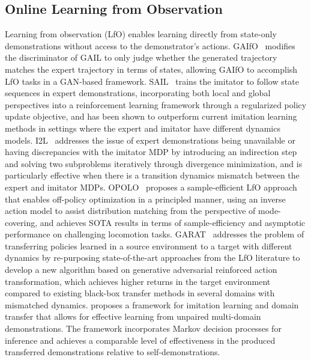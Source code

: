 \subsection{Online Learning from Observation}  
Learning from observation (LfO) enables learning directly from state-only demonstrations without access to the demonstrator's actions. 
GAIfO~\citep{torabi2018generative} modifies the discriminator of GAIL to only judge whether the generated trajectory matches the expert trajectory in terms of states, allowing GAIfO to accomplish LfO tasks in a GAN-based framework.
SAIL~\citep{liu2019state} trains the imitator to follow state sequences in expert demonstrations, incorporating both local and global perspectives into a reinforcement learning framework through a regularized policy update objective, and has been shown to outperform current imitation learning methods in settings where the expert and imitator have different dynamics models.
I2L~\citep{gangwani2020state} addresses the issue of expert demonstrations being unavailable or having discrepancies with the imitator MDP by introducing an indirection step and solving two subproblems iteratively through divergence minimization, and is particularly effective when there is a transition dynamics mismatch between the expert and imitator MDPs.
OPOLO~\citep{zhu2020off} proposes a sample-efficient LfO approach that enables off-policy optimization in a principled manner, using an inverse action model to assist distribution matching from the perspective of mode-covering, and achieves SOTA results in terms of sample-efficiency and asymptotic performance on challenging locomotion tasks.
GARAT~\citep{desai2020imitation} addresses the problem of transferring policies learned in a source environment to a target with different dynamics by re-purposing state-of-the-art approaches from the LfO literature to develop a new algorithm based on generative adversarial reinforced action transformation, which achieves higher returns in the target environment compared to existing black-box transfer methods in several domains with mismatched dynamics.
\citet{raychaudhuri2021cross} proposes a framework for imitation learning and domain transfer that allows for effective learning from unpaired multi-domain demonstrations. The framework incorporates Markov decision processes for inference and achieves a comparable level of effectiveness in the produced transferred demonstrations relative to self-demonstrations.

